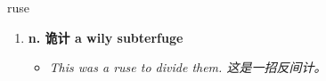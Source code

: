 
\begin{frame}
{\huge ruse}
\begin{center}
\begin{enumerate}\Large
  \item \textbf{n. 诡计 a wily subterfuge}
  \begin{itemize}
    \item \em{\Large{This was a ruse to divide them. 这是一招反间计。}}
  \end{itemize}
\end{enumerate}
\end{center}
\end{frame}
